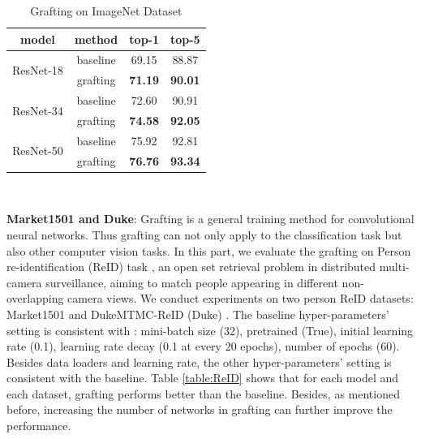 \documentclass{article}
\begin{document}
\begin{table}[!h]
	\caption{Grafting on ImageNet Dataset}
	\begin{center}
		\begin{tabular}{|c|c|c|c|} 
			\hline 
			model&method&top-1&top-5\\ 
			\hline
			\multirow{2}{*}{ResNet-18}&baseline&69.15&88.87\\
			&grafting&\textbf{71.19}&\textbf{90.01}\\
			\hline
			\multirow{2}{*}{ResNet-34}&baseline&72.60&90.91\\
			&grafting&\textbf{74.58}&\textbf{92.05}\\
			\hline
			\multirow{2}{*}{ResNet-50}&baseline&75.92&92.81\\
			&grafting&\textbf{76.76}&\textbf{93.34}\\
			\hline
		\end{tabular}\\
	\end{center}
	\label{table:Imagenet}
\end{table}

\textbf{Market1501 and Duke}: Grafting is a general training method for convolutional neural networks. Thus grafting can not only apply to the classification task but also other computer vision tasks. In this part, we evaluate the grafting on Person re-identification (ReID) task \cite{deng2018image, wei2018person, lin2018multi, wang2018transferable}, an open set retrieval problem in distributed multi-camera surveillance, aiming to match people appearing in different non-overlapping camera views. We conduct experiments on two person ReID datasets: Market1501 \cite{market1505} and DukeMTMC-ReID (Duke) \cite{Ristani2016Performance,zheng2017unlabeled}.
The baseline hyper-parameters' setting is consistent with \cite{zhou2019osnet}: mini-batch size (32), pretrained (True), initial learning rate (0.1), learning rate decay (0.1 at every 20 epochs), number of epochs (60). Besides data loaders and learning rate, the other hyper-parameters' setting is consistent with the baseline. Table \ref{table:ReID} shows that for each model and each dataset, grafting performs better than the baseline. Besides, as mentioned before, increasing the number of networks in grafting can further improve the performance.
\end{document}
